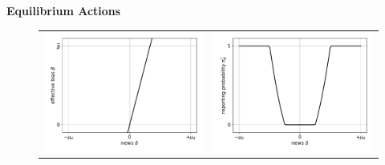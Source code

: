 \documentclass{article}
\begin{document}
\pagebreak
\begin{center}
	\textbf{Equilibrium Actions}
\end{center}
\begin{figure}[h]
	\begin{center}
		\begin{tabular}{cc}
			\includegraphics[scale=.5]{news_effective_bias} & \includegraphics[scale=.5]{news_reporting_probability} \\
		\end{tabular}
	\end{center}
\end{figure}
\end{document}
